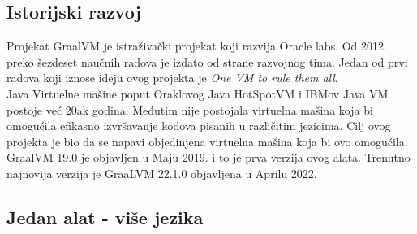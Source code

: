 \documentclass[a4paper]{article}
\begin{document}
\subsection{Istorijski razvoj}
\label{subsec:Istorijski razvoj}

Projekat GraalVM je istraživački projekat koji razvija Oracle labs. Od 2012. preko šezdeset naučnih radova je izdato od strane razvojnog tima. Jedan od prvi radova koji iznose ideju ovog projekta je \textit{One VM to rule them all}. \cite{onevmtorulethemall} \\

Java Virtuelne mašine poput Oraklovog Java HotSpotVM i IBMov Java VM postoje već 20ak godina. Međutim nije postojala virtuelna mašina koja bi omogućila efikasno izvršavanje kodova pisanih u različitim jezicima. Cilj ovog projekta je bio da se napavi objedinjena virtuelna mašina koja bi ovo omogućila.\\

GraalVM 19.0 je objavljen u Maju 2019. i to je prva verzija ovog alata. Trenutno najnovija verzija je GraaLVM 22.1.0 objavljena u Aprilu 2022. \cite{graalvmreleases}



\subsection{Jedan alat - više jezika}
\end{document}
